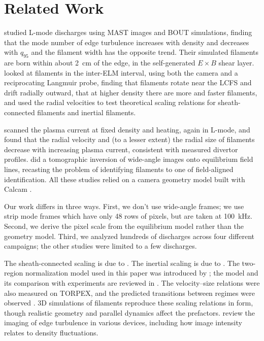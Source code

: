 \section{Related Work}
\label{sec:related}

\citet{dudson2008experiments} studied L-mode discharges using MAST images and BOUT simulations, finding that the mode number of edge turbulence increases with density and decreases with $q_{95}$ and the filament width has the opposite trend. Their simulated filaments are born within about 2~cm of the edge, in the self-generated $E \times B$ shear layer. \citet{benayed2009interelm} looked at filaments in the inter-ELM interval, using both the camera and a reciprocating Langmuir probe, finding that filaments rotate near the LCFS and drift radially outward, that at higher density there are more and faster filaments, and used the radial velocities to test theoretical scaling relations for sheath-connected filaments and inertial filaments.

\citet{kirk2016filaments} scanned the plasma current at fixed density and heating, again in L-mode, and found that the radial velocity and (to a lesser extent) the radial size of filaments decrease with increasing plasma current, consistent with measured divertor profiles. \citet{farley2019identification} did a tomographic inversion of wide-angle images onto equilibrium field lines, recasting the problem of identifying filaments to one of field-aligned identification. All these studies relied on a camera geometry model built with Calcam \citep{silburn2018calcam}.

Our work differs in three ways. First, we don't use wide-angle frames; we use strip mode frames which have only 48 rows of pixels, but are taken at 100~kHz. Second, we derive the pixel scale from the equilibrium model rather than the geometry model. Third, we analyzed hundreds of discharges across four different campaigns; the other studies were limited to a few discharges.

The sheath-connected scaling is due to \citet{krasheninnikov2001scrape}. The inertial scaling is due to \citet{garcia2006fluctuations}. The two-region normalization model used in this paper was introduced by \citet{myra2006collisionality}; the model and its comparison with experiments are reviewed in \citet{dippolito2011convective}. The velocity--size relations were also measured on TORPEX, and the predicted transitions between regimes were observed \citep{theiler2009blob}. 3D simulations of filaments \citep{easy2014three, walkden2015characterization, paruta2018blob} reproduce these scaling relations in form, though realistic geometry and parallel dynamics affect the prefactors. \citet{zweben2007edge} review the imaging of edge turbulence in various devices, including how image intensity relates to density fluctuations.

